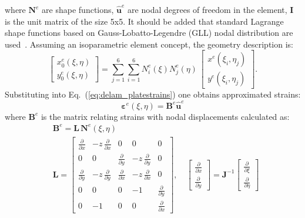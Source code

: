 \documentclass[preprint,12pt]{elsarticle}
\renewcommand{\vec}[1]{\mathbf{#1}}
\renewcommand{\bm}[1]{\mathbf{#1}}
\newcommand{\bs}[1]{\boldsymbol{#1}}
\begin{document}
	where $\bm{N}^e$ are shape functions, $\vec{\hat{u}}^e$ are nodal degrees of freedom in the element, $\bm{I}$ is the unit matrix of the size 5x5. It should be added that standard Lagrange shape functions based on Gauss-Lobatto-Legendre (GLL) nodal distribution are used~\cite{Kudela2007}. Assuming an isoparametric element concept, the geometry description is:
	\begin{equation}
	\left[\begin{array}{l} x_0^e(\xi, \eta) \\ y_0^e(\xi, \eta)  \end{array}\right] = \sum \limits_{j=1}^{6} \sum \limits_{i=1}^{6} N^e_i(\xi) N^e_j(\eta)\, \left[ \begin{array}{l} x^e(\xi_i,\eta_j)\\y^e(\xi_i,\eta_j)\end{array} \right]. \label{eq:delam_plategeom}
	\end{equation}  
	Substituting into Eq.~(\ref{eq:delam_platestrains}) one obtains approximated strains: 
	\begin{equation}
	\bs{\varepsilon}^e(\xi,\eta) = 	\vec{B}^e \vec{\hat{u}}^e \label{eq:delam_plate_relat}
	\end{equation} 
	where $	\vec{B}^e$ is the matrix relating strains with nodal displacements calculated as:
	\begin{equation}
	\begin{split}
	& \vec{B}^e =  \bm{L} \, \bm{N}^e\!(\xi,\eta) \\ 
	& \bm{L} = \left[\begin{array}{ccccc} \frac{\partial}{\partial x} & -z\, \frac{\partial}{\partial x} & 0 & 0 & 0 \\[4pt]
	0&0&\frac{\partial}{\partial y}&-z\, \frac{\partial}{\partial y}&0\\[4pt]
	\frac{\partial}{\partial y} &-z\,\frac{\partial}{\partial y} & \frac{\partial}{\partial x} &-z\,  \frac{\partial}{\partial x} &0 \\[4pt]
	0&0&0&-1&\frac{\partial}{\partial y} \\[4pt]
	0&-1&0&0&\frac{\partial}{\partial x} \end{array} \right], \quad \left[\begin{array}{c}\frac{\partial }{\partial x}\\[4pt] \frac{\partial }{\partial y}\end{array}\right] = \vec{J}^{-1} \left[\begin{array}{c}\frac{\partial }{\partial \xi}\\[4pt] \frac{\partial }{\partial \eta}\end{array}\right]
	\label{eq:delam_plate_disp_strains}
	\end{split}
	\end{equation} 
\end{document}
